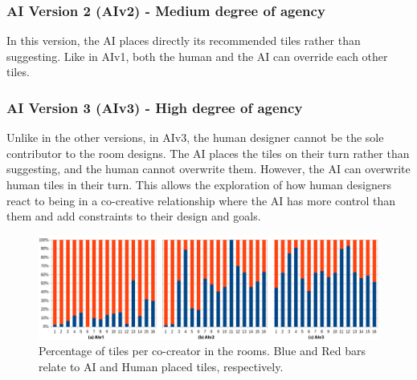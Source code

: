 

\subsubsection{AI Version 2 (AIv2) - Medium degree of agency} 

In this version, the AI places directly its recommended tiles rather than suggesting. Like in AIv1, both the human and the AI can override each other tiles.



\subsubsection{AI Version 3 (AIv3) - High degree of agency} 

Unlike in the other versions, in AIv3, the human designer cannot be the sole contributor to the room designs. The AI places the tiles on their turn rather than suggesting, and the human cannot overwrite them. However, the AI can overwrite human tiles in their turn. This allows the exploration of how human designers react to being in a co-creative relationship where the AI has more control than them and add constraints to their design and goals.


\begin{figure}[]
 \includegraphics[width=\textwidth]{images/combined-bars.png}
 \caption{Percentage of tiles per co-creator in the rooms. Blue and Red bars relate to AI and Human placed tiles, respectively.}
 \label{fig:human-ai-contribution}
\end{figure}

